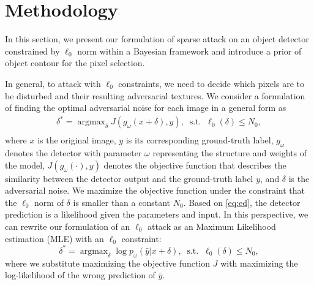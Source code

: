 \documentclass[times,twocolumn,final,authoryear]{elsarticle}
\begin{document}
\section{Methodology}
\label{sec:method}

In this section, we present our formulation of sparse attack on an object detector constrained by $\ell_0$ norm within a Bayesian framework and introduce a prior of object contour for the pixel selection. 





In general, to attack with $\ell_0$ constraints, we need to decide which pixels are to be disturbed and their resulting adversarial textures. We consider a formulation of finding the optimal adversarial noise for each image in a general form as
\begin{equation}
\begin{split}
    \delta^* = \mathop{\arg\max}_{\delta}J(g_\omega(x+ \delta),y), \;
    \operatorname{ s.t. }\;\ell_0(\delta)\leq N_0,\\
\end{split}
    \label{eq:general}
\end{equation}
where $x$ is the original image, $y$ is its corresponding ground-truth label, $g_\omega$ denotes the detector with parameter $\omega$ representing the structure and weights of the model, $J(g_\omega(\cdot),y)$ denotes the objective function that describes the similarity between the detector output and the ground-truth label $y$, and $\delta$ is the adversarial noise. We maximize the objective function under the constraint that the $\ell_0$ norm of $\delta$ is smaller than a constant $N_0$. Based on \cref{eq:ed}, the detector prediction is a likelihood given the parameters and input. In this perspective, we can rewrite our formulation of an $\ell_0$ attack as an Maximum Likelihood estimation (MLE) with an $\ell_0$ constraint:
\begin{equation}
    \delta^* = \mathop{\arg\max}_{\delta}\log p_\omega(\bar{y}|x+\delta), \;
    \operatorname{ s.t. }\;\ell_0(\delta)\leq N_0,
    \label{eq:likelihood}
\end{equation}
where we substitute maximizing the objective function $J$ with maximizing the log-likelihood of the wrong prediction of $\bar{y}$.
\end{document}
